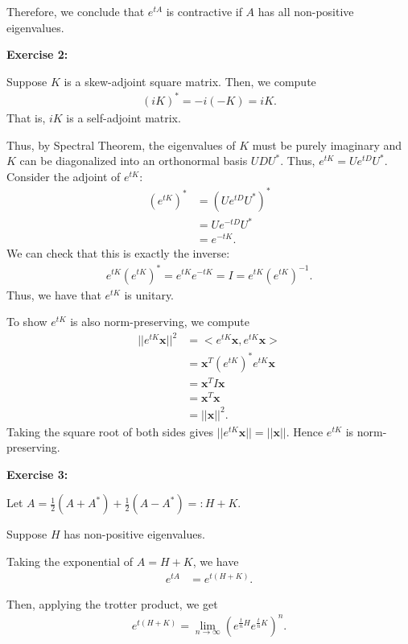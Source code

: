 \documentclass[12pt]{article}
\begin{document}
Therefore, we conclude that $e^{tA}$ is contractive if $A$ has all non-positive eigenvalues.

\noindent{}\textbf{Exercise 2:}

Suppose $K$ is a skew-adjoint square matrix.
Then, we compute
\begin{align*}
    (iK)^* = -i(-K) = iK.
\end{align*}
That is, $iK$ is a self-adjoint matrix.

Thus, by Spectral Theorem, the eigenvalues of $K$ must be purely imaginary and
$K$ can be diagonalized into an orthonormal basis $UDU^*$. Thus, $e^{tK} = Ue^{tD}U^*$.
Consider the adjoint of $e^{tK}$:
\begin{align*}
    (e^{tK})^* & = (Ue^{tD}U^*)^* \\
               & = Ue^{-tD}U^*    \\
               & = e^{-tK}.
\end{align*}
We can check that this is exactly the inverse:
\begin{align*}
    e^{tK} (e^{tK})^* = e^{tK} e^{-tK} = I = e^{tK} (e^{tK})^{-1}.
\end{align*}
Thus, we have that $e^{tK}$ is unitary.

To show $e^{tK}$ is also norm-preserving, we compute
\begin{align*}
    ||e^{tK}\mathbf{x}||^2 & = <e^{tK}\mathbf{x}, e^{tK}\mathbf{x}>      \\
                           & = \mathbf{x}^T (e^{tK})^* e^{tK} \mathbf{x} \\
                           & = \mathbf{x}^T I \mathbf{x}                 \\
                           & = \mathbf{x}^T \mathbf{x}                   \\
                           & = ||\mathbf{x}||^2.
\end{align*}
Taking the square root of both sides gives $||e^{tK}\mathbf{x}|| = ||\mathbf{x}||$.
Hence $e^{tK}$ is norm-preserving.


\noindent{}\textbf{Exercise 3:}

Let $A = \frac{1}{2}(A + A^*) + \frac{1}{2}(A - A^*) =: H + K$.

Suppose $H$ has non-positive eigenvalues.

Taking the exponential of $A=H+K$, we have
\begin{align*}
    e^{tA} & = e^{t(H+K)}.
\end{align*}

Then, applying the trotter product, we get
\begin{align*}
    e^{t(H+K)} = \lim_{n\rightarrow{\infty}}(e^{\frac{t}{n}H}e^{\frac{t}{n}K})^n.
\end{align*}
\end{document}
